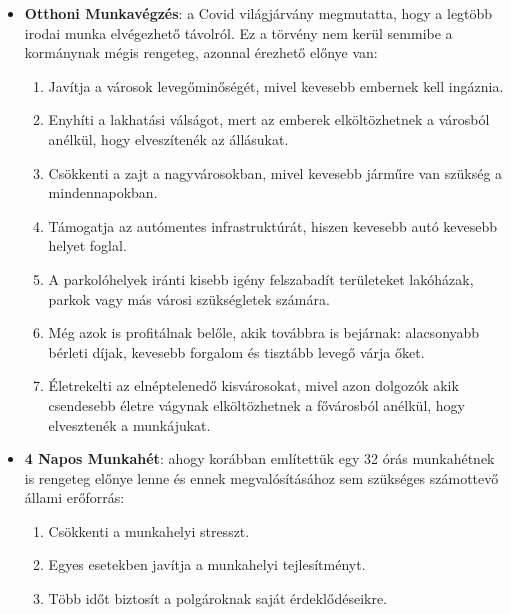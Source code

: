 \begin{itemize}

	\item \textbf{Otthoni Munkavégzés}\cite{work_from_home}: a Covid világjárvány megmutatta, hogy a
	      legtöbb irodai munka elvégezhető távolról. Ez a törvény nem kerül semmibe a kormánynak mégis
	      rengeteg, azonnal érezhető előnye van:
	      \begin{enumerate}
		      \item Javítja a városok levegőminőségét, mivel kevesebb embernek kell ingáznia.

		      \item Enyhíti a lakhatási válságot, mert az emberek elköltözhetnek a városból anélkül,
		            hogy elveszítenék az állásukat.

		      \item Csökkenti a zajt a nagyvárosokban, mivel kevesebb járműre van szükség a mindennapokban.

		      \item Támogatja az autómentes infrastruktúrát, hiszen kevesebb autó kevesebb helyet foglal.

		      \item A parkolóhelyek iránti kisebb igény felszabadít területeket lakóházak, parkok vagy más
		            városi szükségletek számára.

		      \item Még azok is profitálnak belőle, akik továbbra is bejárnak: alacsonyabb bérleti díjak,
		            kevesebb forgalom és tisztább levegő várja őket.

		      \item Életrekelti az elnéptelenedő kisvárosokat, mivel azon dolgozók akik csendesebb életre
		            vágynak elköltözhetnek a fővárosból anélkül, hogy elvesztenék a munkájukat.
	      \end{enumerate}

	\item \textbf{4 Napos Munkahét}: ahogy korábban említettük egy 32 órás munkahétnek is rengeteg előnye
	      lenne és ennek megvalósításához sem szükséges számottevő állami erőforrás:
	      \begin{enumerate}
		      \item Csökkenti a munkahelyi stresszt.

		      \item Egyes esetekben javítja a munkahelyi tejlesítményt.

		      \item Több időt biztosít a polgároknak saját érdeklődéseikre.
	      \end{enumerate}


\end{itemize}
